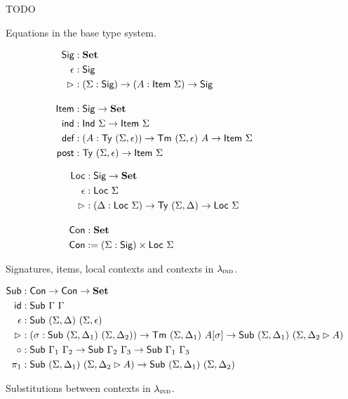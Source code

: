 \begin{figure}[H]
  TODO
  \caption{Equations in the base type system.}
\end{figure}

\begin{figure}[H]
  \begin{minipage}[t]{0.5\textwidth}
  \begin{align*}
  \textsf{Sig} &: \mathbf{Set} \\
  \epsilon &: \textsf{Sig} \\
  \rhd &: (\Sigma : \textsf{Sig}) \to (A : \textsf{Item}\ \Sigma) \to \textsf{Sig} \\[1em]
  \textsf{Item} &: \textsf{Sig} \to \mathbf{Set} \\
  \textsf{ind} &: \textsf{Ind}\ \Sigma \to \textsf{Item}\ \Sigma \\
  \textsf{def} &: (A : \textsf{Ty}\ (\Sigma, \epsilon)) \to \textsf{Tm}\ (\Sigma, \epsilon)\ A \to \textsf{Item}\ \Sigma \\
  \textsf{post} &: \textsf{Ty}\ (\Sigma, \epsilon) \to \textsf{Item}\ \Sigma \\
  \end{align*}
  \end{minipage}
  \begin{minipage}[t]{0.5\textwidth}
  \begin{align*}
  \Loc &: \Sig \to \Set \\
  \epsilon &: \Loc\ \Sigma \\
  \rhd &: (\Delta : \Loc\ \Sigma) \to \Ty\ (\Sigma,\Delta) \to \Loc\ \Sigma \\[1em]
  \Con &: \Set \\
  \Con &:= (\Sigma : \Sig) \times \Loc\ \Sigma
  \end{align*}
  \end{minipage}
  \caption{Signatures, items, local contexts and contexts in $\lambda_{\textsc{ind}}$.}
  \label{fig:lambdaind-signatures-contexts}
\end{figure}

\begin{figure}[H]
  \begin{minipage}[t]{\textwidth}
  \begin{align*}
  \Sub &: \Con \to \Con \to \Set \\
  \mta{id} &: \Sub\ \Gamma\ \Gamma \\
  \epsilon &: \Sub\ (\Sigma, \Delta)\ (\Sigma, \epsilon) \\
  \rhd &: (\sigma : \Sub\ (\Sigma,\Delta_1)\ (\Sigma,\Delta_2)) \to \Tm\ (\Sigma, \Delta_1)\ A[\sigma] \to \Sub\ (\Sigma,\Delta_1)\ (\Sigma,\Delta_2 \rhd A) \\
  \circ &: \Sub\ \Gamma_1\ \Gamma_2 \to \Sub\ \Gamma_2\ \Gamma_3 \to \Sub\ \Gamma_1\ \Gamma_3 \\
  \pi_1 &: \Sub\ (\Sigma,\Delta_1)\ (\Sigma, \Delta_2 \rhd A) \to \Sub\ (\Sigma,\Delta_1)\ (\Sigma,\Delta_2)
  \end{align*}
  \end{minipage}
  \caption{Substitutions between contexts in $\lambda_{\textsc{ind}}$.}
  \label{fig:lambdaind-substitutions}
\end{figure}

